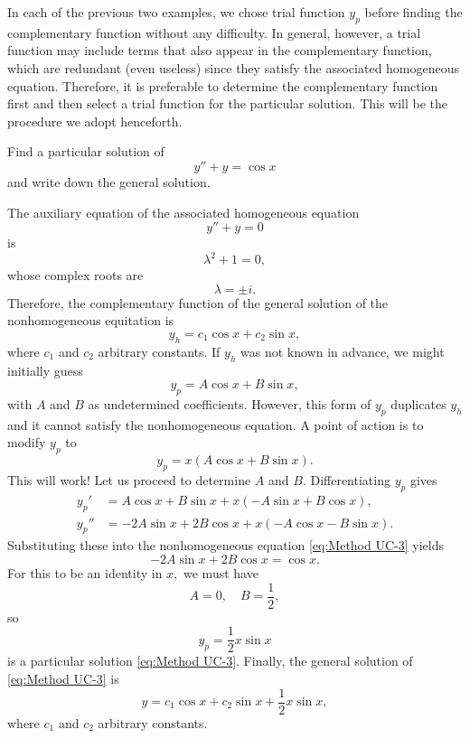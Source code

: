 	In each of the previous two examples, we chose trial function \(y_p\) before finding the complementary function without any difficulty. In general, however, a trial function may include terms that also appear in the complementary function, which are redundant (even useless) since they satisfy the associated homogeneous equation. Therefore, it is preferable to determine the complementary function first and then select a trial function for the particular solution. This will be the procedure we adopt henceforth.


\begin{example}\label{eg:Method-UC-3}
		Find a particular solution of 
		\begin{equation}\label{eq:Method UC-3}
			y'' +y = \cos x
		\end{equation} and write down the general solution.
	\end{example}
	\begin{solution}
	The auxiliary equation of the associated homogeneous equation \[y''+y=0\] is 
	\[\lambda^2 + 1=0,\] whose complex roots are 
	\[\lambda = \pm i.\] Therefore, the complementary function of the general solution of the nonhomogeneous equitation is 
	\[ y_h = c_1 \cos x+ c_2 \sin x,\] where $c_1$ and $c_2$ arbitrary constants.
	 If  $y_h$ was not known in advance, we might initially guess 
	 \[y_p = A\cos x + B\sin x,\] with $A$ and $B$ as undetermined coefficients. However, this form of $y_p$ duplicates $y_h$  and it cannot satisfy the nonhomogeneous equation. A point of action  is to modify  $y_p$ to 
	 \[y_p = x( A\cos x + B\sin x).\] This will work! Let us proceed to determine $A$ and $B.$ Differentiating $y_p$ gives
	 \[\begin{split}
	 	y_p'&=  A\cos x + B\sin x+ x( -A\sin x + B\cos x),\\
	 	y_p''&=  -2A\sin x + 2B\cos x+ x( -A\cos x - B\sin x). 
	 \end{split}\]
	 Substituting these into the nonhomogeneous equation \eqref{eq:Method UC-3} yields
	 \[-2A\sin x + 2B\cos x = \cos x.\] For this to be an identity in $x,$ we must have
	 \[ A= 0, \quad B= \frac{1}{2},\] so 
	 \[y_p = \frac{1}{2}x\sin x\] is a particular solution \eqref{eq:Method UC-3}. Finally, the general solution of \eqref{eq:Method UC-3} is 
	 \[y = c_1 \cos x + c_2 \sin x +\frac{1}{2}x\sin x,\] where $c_1$ and $c_2$ arbitrary constants.
	\end{solution}
	
